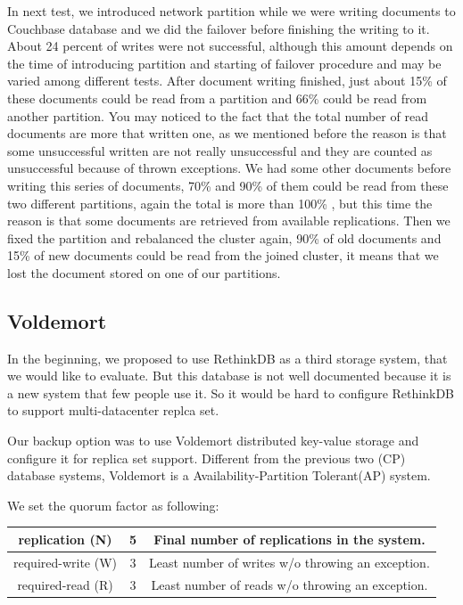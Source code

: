 \documentclass[a4paper]{article}
\begin{document}
In next test, we introduced network partition while we were writing documents to Couchbase database and we did the failover before finishing the writing to it. About 24 percent of writes were not successful, although this amount depends on the time of introducing partition and starting of failover procedure and may be varied among different tests. After document writing finished, just about 15\% of these documents could be read from a partition and 66\% could be read from another partition. You may noticed to the fact that the total number of read documents are more that written one, as we mentioned before the reason is that some unsuccessful written are not really unsuccessful and they are counted as unsuccessful because of thrown exceptions. We had some other documents before writing this series of documents, 70\% and 90\% of them could be read from these two different partitions, again the total is more than 100\% , but this time the reason is that some documents are retrieved from available replications. Then we fixed the partition and rebalanced the cluster again, 90\% of old documents and 15\% of new documents could be read from the joined cluster, it means that we lost the document stored on one of our partitions.


\subsection{Voldemort}

In the beginning, we proposed to use RethinkDB as a third storage system, that we would like to evaluate. But this database is not well documented because it is a new system that few people use it. So it would be hard to configure RethinkDB to support multi-datacenter replca set.

Our backup option was to use Voldemort distributed key-value storage and configure it for replica set support. Different from the previous two (CP) database systems, Voldemort is a Availability-Partition Tolerant(AP) system. 

We set the quorum factor as following:

\begin{table}[hb]
  \centering
  \begin{tabular}{|c|c|c|}
    \hline
    replication (N) & 5 & Final number of replications in the system. \\
    \hline
    required-write (W) & 3 & Least number of writes w/o throwing an exception. \\
    \hline
    required-read (R) & 3 & Least number of reads w/o throwing an exception. \\
    \hline
  \end{tabular}
\end{table}
\end{document}
